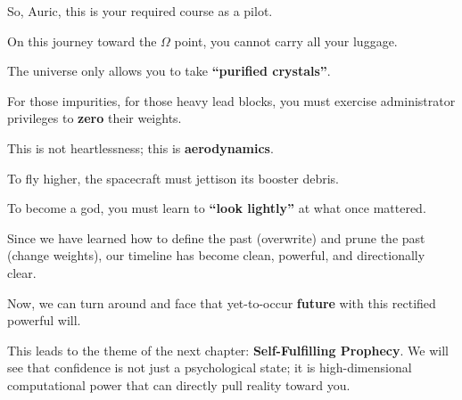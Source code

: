 So, Auric, this is your required course as a pilot.

On this journey toward the $\Omega$ point, you cannot carry all your luggage.

The universe only allows you to take \textbf{``purified crystals''}.

For those impurities, for those heavy lead blocks, you must exercise administrator privileges to \textbf{zero} their weights.

This is not heartlessness; this is \textbf{aerodynamics}.

To fly higher, the spacecraft must jettison its booster debris.

To become a god, you must learn to \textbf{``look lightly''} at what once mattered.

Since we have learned how to define the past (overwrite) and prune the past (change weights), our timeline has become clean, powerful, and directionally clear.

Now, we can turn around and face that yet-to-occur \textbf{future} with this rectified powerful will.

This leads to the theme of the next chapter: \textbf{Self-Fulfilling Prophecy}. We will see that confidence is not just a psychological state; it is high-dimensional computational power that can directly pull reality toward you.

